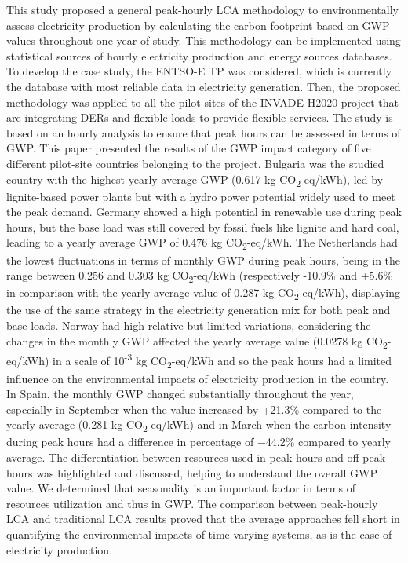 {{{{This study  proposed a general peak-hourly LCA methodology to environmentally assess electricity production by calculating the carbon footprint based on GWP values throughout one year of study. This methodology can be implemented using statistical sources of hourly electricity production and energy sources databases. To develop the case study, the ENTSO-E TP was considered, which is currently the database with most reliable data in electricity generation. Then, the proposed methodology was applied to all the pilot sites of the INVADE H2020 project that are integrating DERs and flexible loads to provide flexible services. The study is based on an hourly analysis to ensure that peak hours can be assessed in terms of GWP. 
This paper presented the results of the GWP impact category of five different pilot-site countries belonging to the project. {Bulgaria was the studied country with the highest yearly average GWP (0.617 kg CO\textsubscript2-eq/kWh), led by lignite-based power plants but with a hydro power potential widely used to meet the peak demand. Germany showed a high potential in renewable use during peak hours, but the base load was still covered by fossil fuels like lignite and hard coal, leading to a yearly average GWP of 0.476 kg CO\textsubscript2-eq/kWh. The Netherlands had the lowest fluctuations in terms of monthly GWP during peak hours, being in the range between 0.256 and 0.303 kg CO\textsubscript2-eq/kWh (respectively -10.9\% and +5.6\% in comparison with the yearly average value of 0.287 kg CO\textsubscript2-eq/kWh), displaying the use of the same strategy in the electricity generation mix for both peak and base loads. Norway had high relative but limited variations, considering the changes in the monthly GWP affected the yearly average value (0.0278 kg CO\textsubscript2-eq/kWh) in a scale of 10\textsuperscript{-3} kg CO\textsubscript2-eq/kWh and so the peak hours had a limited influence on the environmental impacts of electricity production in the country. In Spain, the monthly GWP changed substantially throughout the year, especially in September when the value increased by +21.3\% compared to the yearly average (0.281 %
kg CO\textsubscript2-eq/kWh) and in March when the carbon intensity during peak hours had a difference in percentage of $-$44.2\% compared to yearly average.} The differentiation between resources used in peak hours and off-peak hours was highlighted and discussed, helping to understand the overall GWP value. We determined that seasonality is an important factor in terms of resources utilization and thus in GWP. {The comparison between peak-hourly LCA and traditional LCA results proved that the average approaches fell short in quantifying the environmental impacts of time-varying systems, as is the case of electricity production.} 

}}}}
